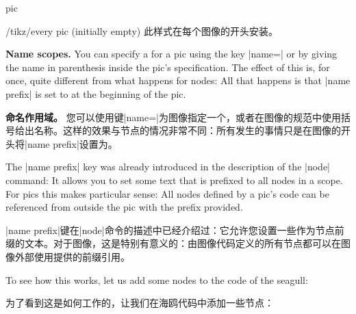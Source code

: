 \begin{pathoperation}{pic}
\begin{stylekey}{/tikz/every pic (initially \normalfont empty)}
        此样式在每个图像的开头安装。
\begin{codeexample}[
    pre={\tikzset{
  seagull/.pic={
    \draw (-3mm,0) to [bend left] (0,0) to [bend left] (3mm,0);
  },
}}]
\end{codeexample}
    \end{stylekey}

    \medskip
    \textbf{Name scopes.}
    You can specify a  for a pic using the key |name=| or
    by giving the name in parenthesis inside the pic's specification. The
    effect of this is, for once, quite different from what happens for nodes:
    All that happens is that |name prefix| is set to  at the
    beginning of the pic.

    \textbf{命名作用域。}
您可以使用键|name=|为图像指定一个，或者在图像的规范中使用括号给出名称。这样的效果与节点的情况非常不同：所有发生的事情只是在图像的开头将|name prefix|设置为。

    The |name prefix| key was already introduced in the description of the
    |node| command: It allows you to set some text that is prefixed to all
    nodes in a scope. For pics this makes particular sense: All nodes defined
    by a pic's code can be referenced from outside the pic with the prefix
    provided.

    |name prefix|键在|node|命令的描述中已经介绍过：它允许您设置一些作为节点前缀的文本。对于图像，这是特别有意义的：由图像代码定义的所有节点都可以在图像外部使用提供的前缀引用。



    To see how this works, let us add some nodes to the code of the seagull:
    
    为了看到这是如何工作的，让我们在海鸥代码中添加一些节点：


\begin{codeexample}
\end{codeexample}
\end{pathoperation}
